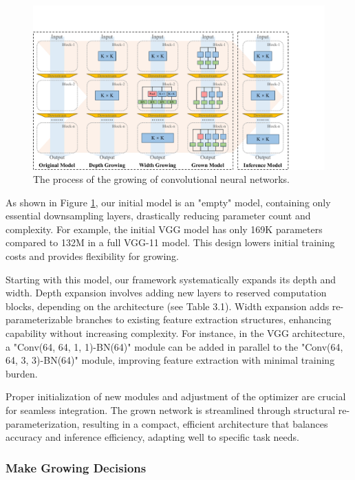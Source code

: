 \documentclass[preprint,12pt]{elsarticle}
\begin{document}
\begin{figure}
  \centering
  \includegraphics[width=\textwidth]{imgs/cnn.pdf}
  \caption{The process of the growing of convolutional neural networks.}
  \label{fig:cnn}
\end{figure}

As shown in Figure \ref{fig:cnn}, our initial model is an "empty" model, containing only essential downsampling layers, drastically reducing parameter count and complexity. For example, the initial VGG model has only 169K parameters compared to 132M in a full VGG-11 model. This design lowers initial training costs and provides flexibility for growing.

Starting with this model, our framework systematically expands its depth and width. Depth expansion involves adding new layers to reserved computation blocks, depending on the architecture (see Table 3.1). Width expansion adds re-parameterizable branches to existing feature extraction structures, enhancing capability without increasing complexity. For instance, in the VGG architecture, a "Conv(64, 64, 1, 1)-BN(64)" module can be added in parallel to the "Conv(64, 64, 3, 3)-BN(64)" module, improving feature extraction with minimal training burden.

Proper initialization of new modules and adjustment of the optimizer are crucial for seamless integration. The grown network is streamlined through structural re-parameterization, resulting in a compact, efficient architecture that balances accuracy and inference efficiency, adapting well to specific task needs.

\subsubsection{Make Growing Decisions}
\end{document}
